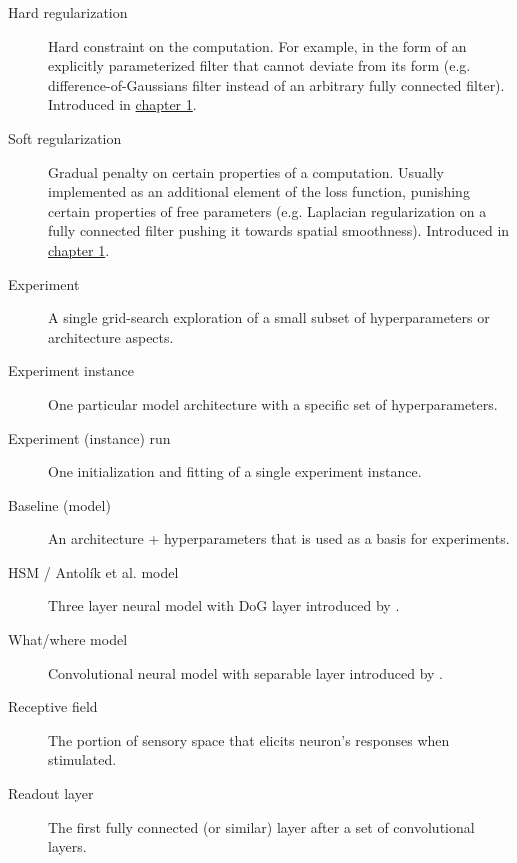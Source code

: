 
\begin{description}
	
	\item[Hard regularization]\label{glos:hard-reg} Hard constraint on the computation. For example, in the form of an explicitly parameterized filter that cannot deviate from its form (e.g. difference-of-Gaussians filter instead of an arbitrary fully connected filter). Introduced in \hyperref[intr:hard-reg]{chapter 1}.
	
	\item[Soft regularization]\label{glos:soft-reg} Gradual penalty on certain properties of a computation. Usually implemented as an additional element of the loss function, punishing certain properties of free parameters (e.g. Laplacian regularization on a fully connected filter pushing it towards spatial smoothness). Introduced in \hyperref[intr:soft-reg]{chapter 1}.
	
	\item[Experiment] A single grid-search exploration of a small subset of hyperparameters or architecture aspects.
	
	\item[Experiment instance] One particular model architecture with a specific set of hyperparameters.
	
	\item[Experiment (instance) run] One initialization and fitting of a single experiment instance.
	
	\item[Baseline (model)] An architecture + hyperparameters that is used as a basis for experiments.
	
	\item[HSM / Antolík et al. model] Three layer neural model with DoG layer introduced by \cite{antolik}.

	\item[What/where model] Convolutional neural model with separable layer introduced by \cite{klindt}.

	\item[Receptive field] The portion of sensory space that elicits neuron’s responses when stimulated.

	\item[Readout layer] The first fully connected (or similar) layer after a set of convolutional layers.

\end{description}

